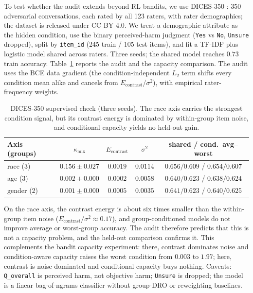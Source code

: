 \documentclass{article}
\newcommand{\kmix}{\kappa_{\mathrm{mix}}}
\begin{document}
To test whether the audit extends beyond RL bandits, we use DICES-350
\citep{arroyo2023dices}: 350 adversarial conversations, each rated by all 123
raters, with rater demographics; the dataset is released under CC BY 4.0. We
treat a demographic attribute as the hidden condition, use
the binary perceived-harm judgment (\texttt{Yes} vs \texttt{No},
\texttt{Unsure} dropped), split by \texttt{item\_id} (245 train / 105 test
items), and fit a TF-IDF plus logistic model shared across raters. Three
seeds; the shared model reaches $0.73$ train accuracy. Table~\ref{tab:dices}
reports the audit and the capacity comparison. The audit uses the BCE data
gradient (the condition-independent $L_2$ term shifts every condition mean
alike and cancels from $E_{\mathrm{contrast}}$/$\sigma^2$), with empirical
rater-frequency weights.

\begin{table}[t]
\caption{DICES-350 supervised check (three seeds). The race axis carries the
strongest condition signal, but its contrast energy is dominated by
within-group item noise, and conditional capacity yields no held-out gain.}
\label{tab:dices}
\begin{center}
\begin{tabular}{lcccc}
\toprule
Axis (groups) & $\kmix$ & $E_{\mathrm{contrast}}$ & $\sigma^2$ &
shared / cond.\ avg--worst \\
\midrule
race (3) & $0.156\pm0.027$ & $0.0019$ & $0.0114$ & $0.656/0.609$ / $0.654/0.607$ \\
age (3) & $0.002\pm0.000$ & $0.0002$ & $0.0058$ & $0.640/0.623$ / $0.638/0.624$ \\
gender (2) & $0.001\pm0.000$ & $0.0005$ & $0.0035$ & $0.641/0.623$ / $0.640/0.625$ \\
\bottomrule
\end{tabular}
\end{center}
\end{table}

On the race axis, the contrast energy is about six times smaller than the
within-group item noise ($E_{\mathrm{contrast}}/\sigma^2\approx0.17$), and
group-conditioned models do not improve average or worst-group accuracy. The
audit therefore predicts that this is not a capacity problem, and the
held-out comparison confirms it. This complements the bandit capacity
experiment: there, contrast dominates noise and condition-aware capacity
raises the worst condition from $0.003$ to $1.97$; here, contrast is
noise-dominated and conditional capacity buys nothing. Caveats:
\texttt{Q\_overall} is perceived harm, not objective harm; \texttt{Unsure} is
dropped; the model is a linear bag-of-ngrams classifier without group-DRO or
reweighting baselines.
\end{document}
